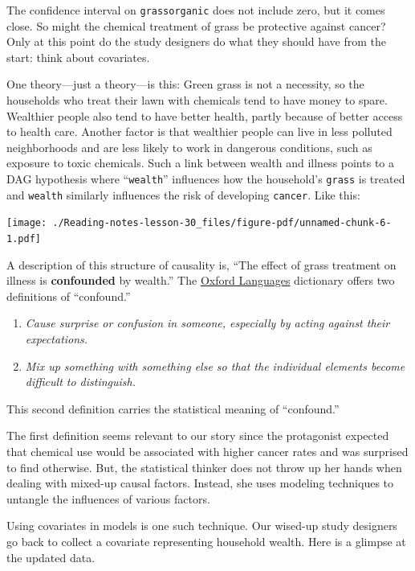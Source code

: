 \documentclass[
  letterpaper,
  DIV=11,
  numbers=noendperiod,
  oneside]{scrreprt}
\providecommand{\tightlist}{%
  \setlength{\itemsep}{0pt}\setlength{\parskip}{0pt}}\usepackage{longtable,booktabs,array}
\begin{document}
The confidence interval on \texttt{grassorganic} does not include zero,
but it comes close. So might the chemical treatment of grass be
protective against cancer? Only at this point do the study designers do
what they should have from the start: think about covariates.

One theory---just a theory---is this: Green grass is not a necessity, so
the households who treat their lawn with chemicals tend to have money to
spare. Wealthier people also tend to have better health, partly because
of better access to health care. Another factor is that wealthier people
can live in less polluted neighborhoods and are less likely to work in
dangerous conditions, such as exposure to toxic chemicals. Such a link
between wealth and illness points to a DAG hypothesis where
``\texttt{wealth}'' influences how the household's \texttt{grass} is
treated and \texttt{wealth} similarly influences the risk of developing
\texttt{cancer}. Like this:

\texttt{[image: ./Reading-notes-lesson-30\_files/figure-pdf/unnamed-chunk-6-1.pdf]}

A description of this structure of causality is, ``The effect of grass
treatment on illness is \textbf{confounded} by wealth.'' The
\href{https://languages.oup.com/google-dictionary-en/}{Oxford Languages}
dictionary offers two definitions of ``confound.''

\begin{enumerate}
\def\labelenumi{\arabic{enumi}.}
\tightlist
\item
  \emph{Cause surprise or confusion in someone, especially by acting
  against their expectations.}
\item
  \emph{Mix up something with something else so that the individual
  elements become difficult to distinguish.}
\end{enumerate}

This second definition carries the statistical meaning of ``confound.''

The first definition seems relevant to our story since the protagonist
expected that chemical use would be associated with higher cancer rates
and was surprised to find otherwise. But, the statistical thinker does
not throw up her hands when dealing with mixed-up causal factors.
Instead, she uses modeling techniques to untangle the influences of
various factors.

Using covariates in models is one such technique. Our wised-up study
designers go back to collect a covariate representing household wealth.
Here is a glimpse at the updated data.
\end{document}
